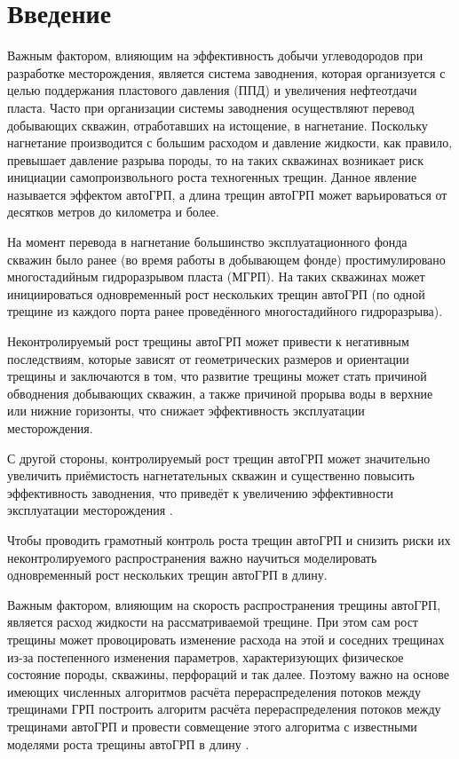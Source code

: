 \chapter*{Введение} %


Важным фактором, влияющим на эффективность добычи углеводородов при разработке месторождения, является система заводнения, которая организуется с целью поддержания пластового давления (ППД) и увеличения нефтеотдачи пласта.
Часто при организации системы заводнения осуществляют перевод добывающих скважин, отработавших на истощение, в нагнетание.
Поскольку нагнетание производится с большим расходом и давление жидкости, как правило, превышает давление разрыва породы, то на таких скважинах возникает риск инициации самопроизвольного роста техногенных трещин.
Данное явление называется эффектом автоГРП, а длина трещин автоГРП может варьироваться от десятков метров до километра и более.

На момент перевода в нагнетание большинство эксплуатационного фонда скважин было ранее (во время работы в добывающем фонде) простимулировано многостадийным гидроразрывом пласта (МГРП).
На таких скважинах может инициироваться одновременный рост нескольких трещин автоГРП (по одной трещине из каждого порта ранее проведённого многостадийного гидроразрыва).

Неконтролируемый рост трещины автоГРП может привести к негативным последствиям, которые зависят от геометрических размеров и ориентации трещины и заключаются в том, что развитие трещины может стать причиной обводнения добывающих скважин, а также причиной прорыва воды в верхние или нижние горизонты, что снижает эффективность эксплуатации месторождения.

С другой стороны, контролируемый рост трещин автоГРП может значительно увеличить приёмистость нагнетательных скважин и существенно повысить эффективность заводнения, что приведёт к увеличению эффективности эксплуатации месторождения \cite{bazyrov_shel, yakupov}.

Чтобы проводить грамотный контроль роста трещин автоГРП и снизить риски их неконтролируемого распространения важно научиться моделировать одновременный рост нескольких трещин автоГРП в длину.

Важным фактором, влияющим на скорость распространения трещины автоГРП, является расход жидкости на рассматриваемой трещине.
При этом сам рост трещины может провоцировать изменение расхода на этой и соседних трещинах из-за постепенного изменения параметров, характеризующих физическое состояние породы, скважины, перфораций и так далее.
Поэтому важно на основе имеющих численных алгоритмов расчёта перераспределения потоков между трещинами ГРП \cite{elbel} построить алгоритм расчёта перераспределения потоков между трещинами автоГРП и провести совмещение этого алгоритма с известными моделями роста трещины автоГРП в длину \cite{koning}.

